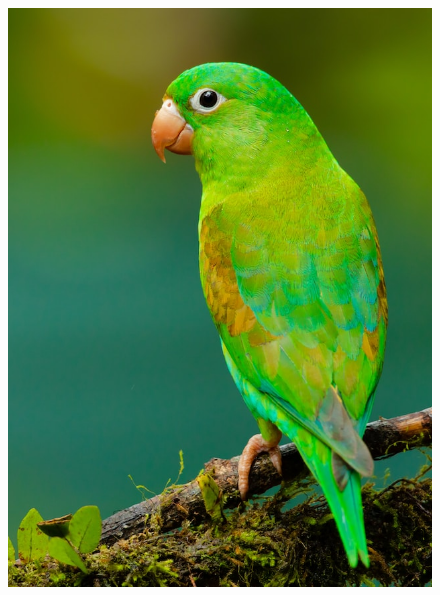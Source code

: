 \begin{figure}
  \centering
  \begin{minipage}[c]{0.33\linewidth}
    \centering
    \includegraphics[width=1.\linewidth]{images/hpcom/parrot3.jpg}
  \end{minipage}
  \begin{minipage}[c]{0.33\linewidth}
    \centering

\end{minipage}
\end{figure}
